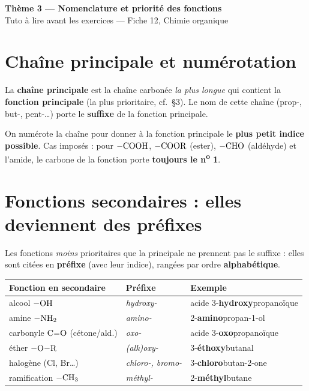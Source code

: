 \documentclass[11pt,a4paper]{article}
\newcommand{\banner}[2]{%
\begin{tcolorbox}[enhanced,colback=primary,colframe=primary,arc=5pt,boxrule=0pt,
   left=5mm,right=5mm,top=2.5mm,bottom=2.5mm,coltext=white]
{\large\bfseries #1}\\[1pt]{\small #2}
\end{tcolorbox}\vspace{1pt}}
\begin{document}
\banner{Thème 3 — Nomenclature et priorité des fonctions}{%
Tuto à lire avant les exercices — Fiche 12, Chimie organique}

\section{Chaîne principale et numérotation}
\begin{regle}
La \textbf{chaîne principale} est la chaîne carbonée \emph{la plus longue} qui contient la \textbf{fonction principale} (la plus prioritaire, cf.\ §3). Le nom de cette chaîne (prop-, but-, pent-\dots) porte le \textbf{suffixe} de la fonction principale.
\end{regle}
\begin{regle}[Numérotation]
On numérote la chaîne pour donner à la fonction principale le \textbf{plus petit indice possible}. Cas imposés : pour $\ce{-COOH}$, $\ce{-COOR}$ (ester), $\ce{-CHO}$ (aldéhyde) et l'amide, le carbone de la fonction porte \textbf{toujours le n\textsuperscript{o} 1}.
\end{regle}

\section{Fonctions secondaires : elles deviennent des préfixes}
Les fonctions \emph{moins} prioritaires que la principale ne prennent pas le suffixe : elles sont citées en \textbf{préfixe} (avec leur indice), rangées par ordre \textbf{alphabétique}.
\begin{center}\small\renewcommand{\arraystretch}{1.1}
\begin{tabular}{lll}
\toprule
Fonction en secondaire & Préfixe & Exemple \\
\midrule
alcool $\ce{-OH}$ & \textit{hydroxy-} & acide 3-\textbf{hydroxy}propanoïque \\
amine $\ce{-NH2}$ & \textit{amino-} & 2-\textbf{amino}propan-1-ol \\
carbonyle $\ce{C=O}$ (cétone/ald.) & \textit{oxo-} & acide 3-\textbf{oxo}propanoïque \\
éther $\ce{-O-R}$ & \textit{(alk)oxy-} & 3-\textbf{éthoxy}butanal \\
halogène (Cl, Br\dots) & \textit{chloro-, bromo-} & 3-\textbf{chloro}butan-2-one \\
ramification $\ce{-CH3}$ & \textit{méthyl-} & 2-\textbf{méthyl}butane \\
\bottomrule
\end{tabular}
\end{center}
\end{document}
